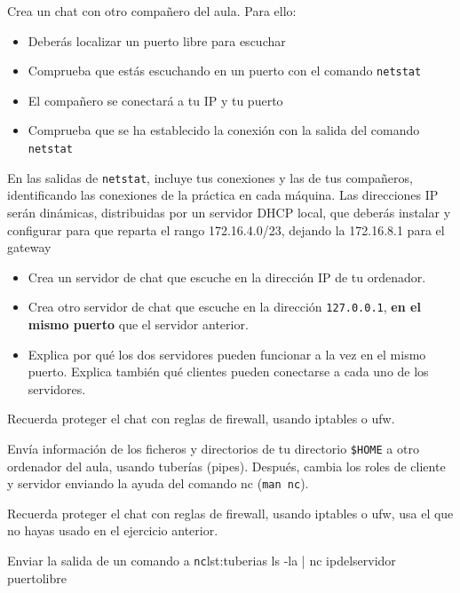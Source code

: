 \begin{homeworkProblem}
  Crea un chat con otro compañero del aula. Para ello:
  \begin{itemize}
  \item Deberás localizar un puerto libre para escuchar
  \item Comprueba que estás escuchando en un puerto con el comando \texttt{netstat}
  \item El compañero se conectará a tu IP y tu puerto
  \item Comprueba que se ha establecido la conexión con la salida del comando \texttt{netstat}
  \end{itemize}


  En las salidas de \texttt{netstat}, incluye tus conexiones y las de tus compañeros, identificando las conexiones de la práctica en cada máquina.
          {\noindent\hspace{-100cm}Las direcciones IP serán dinámicas, distribuidas por un servidor DHCP local, que deberás instalar y  configurar para que reparta el rango 172.16.4.0/23, dejando la 172.16.8.1 para el gateway}
\end{homeworkProblem}

\begin{homeworkProblem}
  \begin{itemize}
  \item Crea un servidor de chat que escuche en la dirección IP de tu ordenador.
  \item Crea otro servidor de chat que escuche en la dirección \texttt{127.0.0.1}, \textbf{en el mismo puerto} que el servidor anterior.
  \item Explica por qué los dos servidores pueden funcionar a la vez en el mismo puerto. Explica también qué clientes pueden conectarse a cada uno de los servidores.
  \end{itemize}
        {\noindent\hspace{-100cm}Recuerda proteger el chat con reglas de firewall, usando iptables o ufw.}  
\end{homeworkProblem}



\begin{homeworkProblem}
  Envía información de los ficheros y directorios de tu directorio \texttt{\$HOME} a otro ordenador del aula, usando tuberías (pipes). Después, cambia los roles de cliente y servidor enviando la ayuda del comando nc (\texttt{man nc}).

        {\noindent\hspace{-100cm}Recuerda proteger el chat con reglas de firewall, usando iptables o ufw, usa el que no hayas usado en el ejercicio anterior.}




\begin{listadoshell}{Enviar la salida de un comando a \texttt{nc}}{lst:tuberias}
ls -la | nc ipdelservidor puertolibre
\end{listadoshell}
\end{homeworkProblem}


